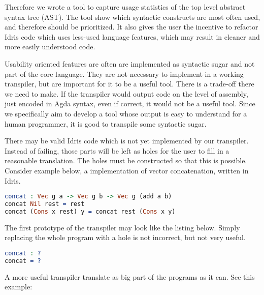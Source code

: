 \documentclass[parskip=half]{scrartcl}
\begin{document}

Therefore we wrote a tool to capture usage statistics of the top level abstract
syntax tree (AST). The tool show which syntactic constructs are most often
used, and therefore should be prioritized. It also gives the user the
incentive to refactor Idris code which uses less-used language features,
which may result in cleaner and more easily understood code.

Usability oriented features are often are implemented as syntactic sugar and
not part of the core language. They are not necessary to implement in a working
transpiler, but are important for it to be a useful tool. There is a trade-off
there we need to make. If the transpiler would output code on the level of
assembly, just encoded in Agda syntax, even if correct, it would not be a useful
tool. Since we specifically aim to develop a tool whose output is easy to
understand for a human programmer, it is good to transpile some syntactic sugar.



There may be valid Idris code which is not yet implemented by our transpiler.
Instead of failing, those parts will be left as holes for the user to fill in
a reasonable translation.
The holes must be constructed so that this is possible.
Consider example below, a implementation of vector concatenation, written in
Idris.

\begin{lstlisting}[language=Idris,label={lst:hole1},caption={}]
concat : Vec g a -> Vec g b -> Vec g (add a b)
concat Nil rest = rest
concat (Cons x rest) y = concat rest (Cons x y)
\end{lstlisting}

The first prototype of the transpiler may look like the listing below.
Simply replacing the whole program with a hole is not incorrect, but not very
useful.

\begin{lstlisting}[language=Idris,label={lst:hole2},caption={}]
concat : ?
concat = ?
\end{lstlisting}

A more useful transpiler translate as big part of the programs as it can. See
this example: %
\end{document}
